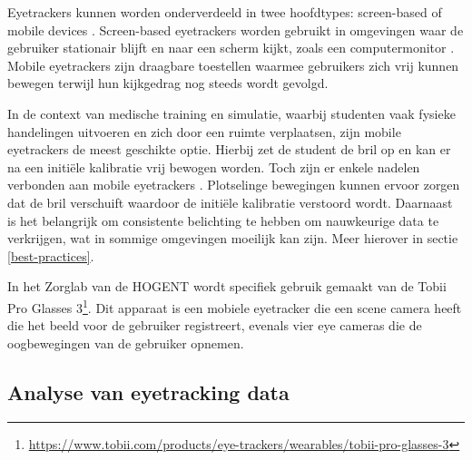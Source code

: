Eyetrackers kunnen worden onderverdeeld in twee hoofdtypes: screen-based of mobile devices \autocite{PAUSZEK2023100031}.
Screen-based eyetrackers worden gebruikt in omgevingen waar de gebruiker stationair blijft en naar een scherm kijkt, zoals een computermonitor .
Mobile eyetrackers zijn draagbare toestellen waarmee gebruikers zich vrij kunnen bewegen terwijl hun kijkgedrag nog steeds wordt gevolgd.
\newline \par
In de context van medische training en simulatie, waarbij studenten vaak fysieke handelingen uitvoeren en zich door een ruimte verplaatsen, zijn mobile eyetrackers de meest geschikte optie.
Hierbij zet de student de bril op en kan er na een initiële kalibratie vrij bewogen worden.
Toch zijn er enkele nadelen verbonden aan mobile eyetrackers \autocite{PAUSZEK2023100031}. 
Plotselinge bewegingen kunnen ervoor zorgen dat de bril verschuift waardoor de initiële kalibratie verstoord wordt.
Daarnaast is het belangrijk om consistente belichting te hebben om nauwkeurige data te verkrijgen, wat in sommige omgevingen moeilijk kan zijn.
Meer hierover in sectie \ref{best-practices}.
\newline \par
In het Zorglab van de HOGENT wordt specifiek gebruik gemaakt van de Tobii Pro Glasses 3\footnote{\url{https://www.tobii.com/products/eye-trackers/wearables/tobii-pro-glasses-3}}. 
Dit apparaat is een mobiele eyetracker die een scene camera heeft die het beeld voor de gebruiker registreert, evenals vier eye cameras die de oogbewegingen van de gebruiker opnemen.

\subsection{Analyse van eyetracking data}

